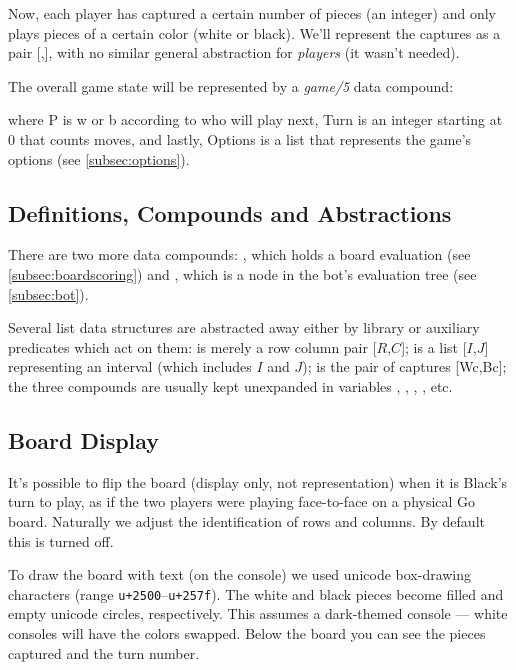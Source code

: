 \documentclass[12pt,a4paper,notitlepage]{article}
\begin{document}
Now, each player has captured a certain number of pieces (an integer) and only plays pieces of a certain color (white or black). We'll represent the captures as a pair [,], with no similar general abstraction for \textit{players} (it wasn't needed).

The overall game state will be represented by a \textit{game/5} data compound:
\begin{center}
\end{center}
where P is w or b according to who will play next, Turn is an integer starting at 0 that counts moves, and lastly, Options is a list that represents the game's options (see \autoref{subsec:options}).

\subsection{Definitions, Compounds and Abstractions}
\label{subsec:abstractions}

There are two more data compounds: , which holds a board evaluation (see \autoref{subsec:boardscoring}) and , which is a node in the bot's evaluation tree (see \autoref{subsec:bot}).

Several list data structures are abstracted away either by library  or auxiliary predicates which act on them:  is merely a row column pair [$R$,$C$];  is a list [$I$,$J$] representing an interval (which includes $I$ and $J$);  is the pair of captures [Wc,Bc]; the three compounds are usually kept unexpanded in variables , , , , etc.

\subsection{Board Display}
\label{sec:boarddisplay}

It's possible to flip the board (display only, not representation) when it is Black's turn to play, as if the two players were playing face-to-face on a physical Go board. Naturally we adjust the identification of rows and columns. By default this is turned off.

To draw the board with text (on the console) we used unicode box-drawing characters (range \texttt{u+2500}--\texttt{u+257f}). The white and black pieces become filled and empty unicode circles, respectively. This assumes a dark-themed console --- white consoles will have the colors swapped.
Below the board you can see the pieces captured and the turn number.
\end{document}
